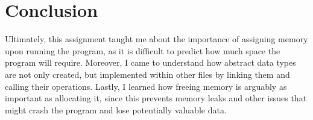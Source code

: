 \documentclass[12pt]{article}
\begin{document}
\section{Conclusion}

Ultimately, this assignment taught me about the importance of assigning memory upon running the program, as it is difficult to predict how much space the program will require. Moreover, I came to understand how abstract data types are not only created, but implemented within other files by linking them and calling their operations. Lastly, I learned how freeing memory is arguably as important as allocating it, since this prevents memory leaks and other issues that might crash the program and lose potentially valuable data.
\end{document}
